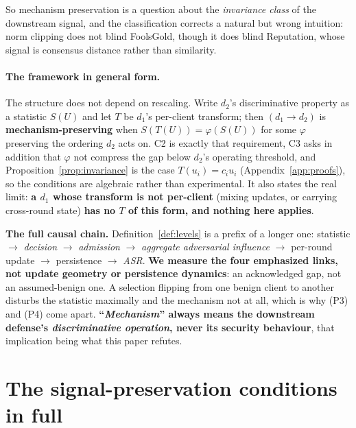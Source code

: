 \documentclass{article}
\begin{document}
\noindent So mechanism preservation is a question about the \emph{invariance class} of the downstream signal, and the classification corrects a natural but wrong intuition: norm clipping does not blind FoolsGold, though it does blind Reputation, whose signal is consensus distance rather than similarity.

\paragraph{The framework in general form.} The structure does not depend on rescaling. Write $d_2$'s discriminative property as a statistic $S(U)$ and let $T$ be $d_1$'s per-client transform; then $(d_1 \to d_2)$ is \textbf{mechanism-preserving} when $S(T(U)) = \varphi(S(U))$ for some $\varphi$ preserving the ordering $d_2$ acts on. C2 is exactly that requirement, C3 asks in addition that $\varphi$ not compress the gap below $d_2$'s operating threshold, and Proposition~\ref{prop:invariance} is the case $T(u_i)=c_iu_i$ (Appendix~\ref{app:proofs}), so the conditions are algebraic rather than experimental. It also states the real limit: \textbf{a $d_1$ whose transform is not per-client} (mixing updates, or carrying cross-round state) \textbf{has no $T$ of this form, and nothing here applies}.

\noindent \textbf{The full causal chain.} Definition~\ref{def:levels} is a prefix of a longer one: statistic $\to$ \emph{decision} $\to$ \emph{admission} $\to$ \emph{aggregate adversarial influence} $\to$ per-round update $\to$ persistence $\to$ \emph{ASR}. \textbf{We measure the four emphasized links, not update geometry or persistence dynamics}: an acknowledged gap, not an assumed-benign one. A selection flipping from one benign client to another disturbs the statistic maximally and the mechanism not at all, which is why (P3) and (P4) come apart. \textbf{``\emph{Mechanism}'' always means the downstream defense's \emph{discriminative operation}, never its security behaviour}, that implication being what this paper refutes.

\section{The signal-preservation conditions in full}
\label{app:conditions}
\end{document}
